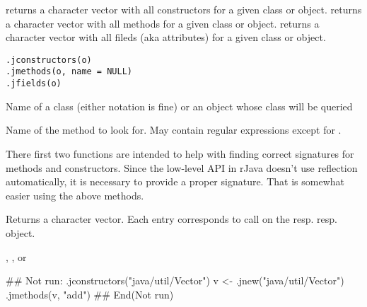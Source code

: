 \begin{Description}\relax
{} returns a character vector with all constructors for
a given class or object.
 returns a character vector with all methods for
a given class or object.
 returns a character vector with all fileds (aka attributes) for a given class or object.
\end{Description}
\begin{Usage}
\begin{verbatim}
.jconstructors(o)
.jmethods(o, name = NULL)
.jfields(o)
\end{verbatim}
\end{Usage}
\begin{Arguments}
\begin{ldescription}
\item[\code{o}] Name of a class (either notation is fine) or an object whose
class will be queried
\item[\code{name}] Name of the method to look for. May contain regular
expressions except for \code{\textasciicircum{}\$}.
\end{ldescription}
\end{Arguments}
\begin{Details}\relax
There first two functions are intended to help with finding correct
signatures for methods and constructors. Since the low-level API in rJava doesn't use reflection automatically, it is necessary to provide a proper
signature. That is somewhat easier using the above methods.
\end{Details}
\begin{Value}
Returns a character vector. Each entry corresponds to
 call on the  resp.  resp. 
object.
\end{Value}
\begin{SeeAlso}\relax
{}, ,  or 
\end{SeeAlso}
\begin{Examples}
\begin{ExampleCode}
## Not run: 
.jconstructors("java/util/Vector")
v <- .jnew("java/util/Vector")
.jmethods(v, "add")
## End(Not run)
\end{ExampleCode}
\end{Examples}

